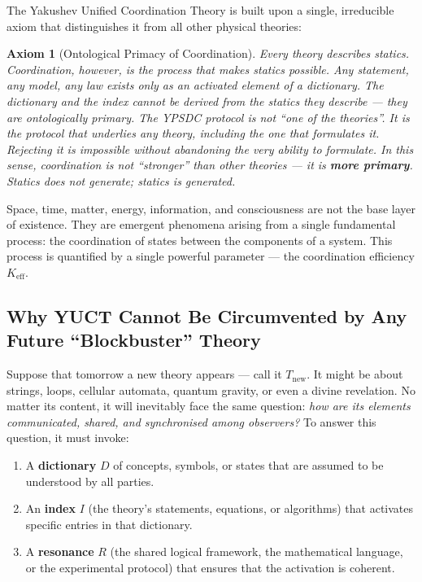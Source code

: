 \documentclass[12pt,a4paper]{article}
\newtheorem{axiom}{Axiom}[section]
\begin{document}
	The Yakushev Unified Coordination Theory is built upon a single, irreducible axiom that distinguishes it from all other physical theories:
	
	\begin{axiom}[Ontological Primacy of Coordination]
		Every theory describes statics. Coordination, however, is the process that makes statics possible. Any statement, any model, any law exists only as an activated element of a dictionary. The dictionary and the index cannot be derived from the statics they describe — they are ontologically primary. The YPSDC protocol is not “one of the theories”. It is the protocol that underlies any theory, including the one that formulates it. Rejecting it is impossible without abandoning the very ability to formulate. In this sense, coordination is not “stronger” than other theories — it is \textbf{more primary}. Statics does not generate; statics is generated.
	\end{axiom}
	
	Space, time, matter, energy, information, and consciousness are not the base layer of existence. They are emergent phenomena arising from a single fundamental process: the coordination of states between the components of a system. This process is quantified by a single powerful parameter — the coordination efficiency \(K_{\mathrm{eff}}\).
	
	\subsection{Why YUCT Cannot Be Circumvented by Any Future “Blockbuster” Theory}
	
	Suppose that tomorrow a new theory appears — call it \(T_{\text{new}}\). It might be about strings, loops, cellular automata, quantum gravity, or even a divine revelation. No matter its content, it will inevitably face the same question: \emph{how are its elements communicated, shared, and synchronised among observers?} To answer this question, it must invoke:
	
	\begin{enumerate}
		\item A \textbf{dictionary} \(D\) of concepts, symbols, or states that are assumed to be understood by all parties.
		\item An \textbf{index} \(I\) (the theory’s statements, equations, or algorithms) that activates specific entries in that dictionary.
		\item A \textbf{resonance} \(R\) (the shared logical framework, the mathematical language, or the experimental protocol) that ensures that the activation is coherent.
	\end{enumerate}
	
\end{document}

